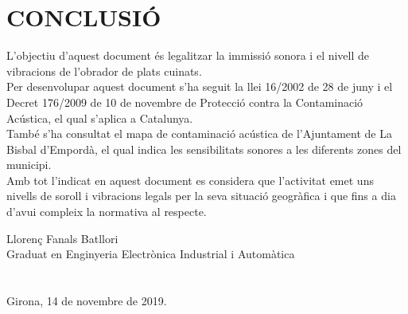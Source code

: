 \chapter{\uppercase{Conclusió}}
L'objectiu d'aquest document és legalitzar la immissió sonora i el nivell de vibracions de l'obrador de plats cuinats.\\
\newline Per desenvolupar aquest document s'ha seguit la llei 16/2002 de 28 de juny i el Decret 176/2009 de 10 de novembre de Protecció contra la Contaminació Acústica, el qual s'aplica a Catalunya.\\
\newline També s'ha consultat el mapa de contaminació acústica de l'Ajuntament de La Bisbal d'Empordà, el qual indica les sensibilitats sonores a les diferents zones del municipi.\\
\newline Amb tot l'indicat en aquest document es considera que l'activitat emet uns nivells de soroll i vibracions legals per la seva situació geogràfica i que fins a dia d'avui compleix la normativa al respecte.

\vspace*{\fill}
\noindent Llorenç Fanals Batllori\\
Graduat en Enginyeria Electrònica Industrial i Automàtica\\
\\
\\
Girona, 14 de novembre de 2019.

\clearpage